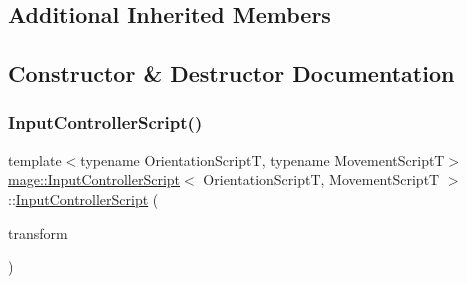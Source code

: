\subsection*{Additional Inherited Members}


\subsection{Constructor \& Destructor Documentation}
\hypertarget{classmage_1_1_input_controller_script_adf1edb71170cb5184f201a64ad7455cb}{}\label{classmage_1_1_input_controller_script_adf1edb71170cb5184f201a64ad7455cb} 
\subsubsection{\texorpdfstring{Input\+Controller\+Script()}{InputControllerScript()}\hspace{0.1cm}{\footnotesize\ttfamily [1/3]}}
{\footnotesize\ttfamily template$<$typename Orientation\+ScriptT, typename Movement\+ScriptT$>$ \\
\hyperlink{classmage_1_1_input_controller_script}{mage\+::\+Input\+Controller\+Script}$<$ Orientation\+ScriptT, Movement\+ScriptT $>$\+::\hyperlink{classmage_1_1_input_controller_script}{Input\+Controller\+Script} (\begin{DoxyParamCaption}\item[{Transform\+Node $\ast$}]{transform }\end{DoxyParamCaption})\hspace{0.3cm}{\ttfamily [explicit]}}

\hypertarget{classmage_1_1_input_controller_script_a22de786b39180e18b8565b211797388d}{}\label{classmage_1_1_input_controller_script_a22de786b39180e18b8565b211797388d} 
